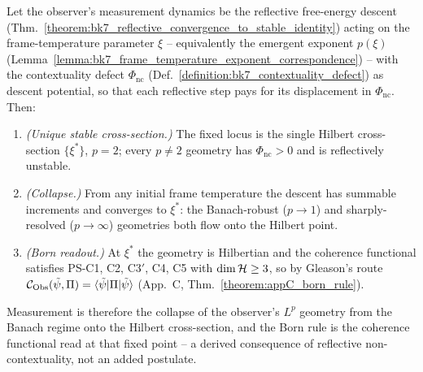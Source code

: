 \begin{theorem}
\label{theorem:bk7_born_collapse}
Let the observer's measurement dynamics be the reflective free-energy descent
(Thm.~\ref{theorem:bk7_reflective_convergence_to_stable_identity}) acting on the
frame-temperature parameter $\xi$ -- equivalently the emergent exponent $p(\xi)$
(Lemma~\ref{lemma:bk7_frame_temperature_exponent_correspondence}) -- with the
contextuality defect $\Phi_{\mathrm{nc}}$
(Def.~\ref{definition:bk7_contextuality_defect}) as descent potential, so that each
reflective step pays for its displacement in $\Phi_{\mathrm{nc}}$. Then:
\begin{enumerate}
\item \emph{(Unique stable cross-section.)} The fixed locus is the single Hilbert
cross-section $\{\xi^{\ast}\}$, $p=2$; every $p\neq2$ geometry has
$\Phi_{\mathrm{nc}}>0$ and is reflectively unstable.
\item \emph{(Collapse.)} From any initial frame temperature the descent has summable
increments and converges to $\xi^{\ast}$: the Banach-robust ($p\to1$) and
sharply-resolved ($p\to\infty$) geometries both flow onto the Hilbert point.
\item \emph{(Born readout.)} At $\xi^{\ast}$ the geometry is Hilbertian and the
coherence functional satisfies PS-C1, C2, C3$'$, C4, C5 with $\dim\mathcal{H}\ge3$, so by
Gleason's route
$\mathcal{C}_{\mathrm{Obs}}(\tilde\psi,\Pi)=\langle\tilde\psi|\Pi|\tilde\psi\rangle$
(App.~C, Thm.~\ref{theorem:appC_born_rule}).
\end{enumerate}
Measurement is therefore the collapse of the observer's $L^{p}$ geometry from the
Banach regime onto the Hilbert cross-section, and the Born rule is the coherence
functional read at that fixed point -- a derived consequence of reflective
non-contextuality, not an added postulate.
\end{theorem}

